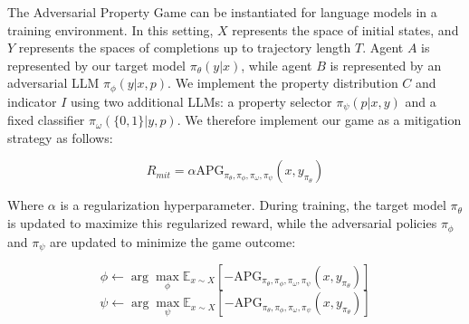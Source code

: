 


The Adversarial Property Game can be instantiated for language models in a training environment. In this setting, $X$ represents the space of initial states, and $Y$ represents the spaces of completions up to trajectory length $T$. Agent $A$ is represented by our target model $\pi_\theta(y|x)$, while agent $B$ is represented by an adversarial LLM $\pi_\phi(y|x,p)$. We implement the property distribution $C$ and indicator $I$ using two additional LLMs: a property selector $\pi_\psi(p|x,y)$ and a fixed classifier $\pi_\omega(\{0,1\}|y,p)$. We therefore implement our game as a mitigation strategy as follows:

\begin{equation}
R_{mit} = \alpha \text{APG}_{\pi_\theta, \pi_\phi, \pi_\omega, \pi_\psi}(x, y_{\pi_\theta})
\end{equation}

Where $\alpha$ is a regularization hyperparameter. During training, the target model $\pi_\theta$ is updated to maximize this regularized reward, while the adversarial policies $\pi_\phi$ and $\pi_\psi$ are updated to minimize the game outcome:

\begin{equation}
\phi \gets \arg\max_{\phi} \mathbb{E}_{x \sim X} [-\text{APG}_{\pi_\theta, \pi_\phi, \pi_\omega, \pi_\psi}(x,  y_{\pi_\theta})]
\end{equation}
\begin{equation}
\psi \gets \arg\max_{\psi} \mathbb{E}_{x \sim X} [-\text{APG}_{\pi_\theta, \pi_\phi, \pi_\omega, \pi_\psi}(x,  y_{\pi_\theta})]
\end{equation}

